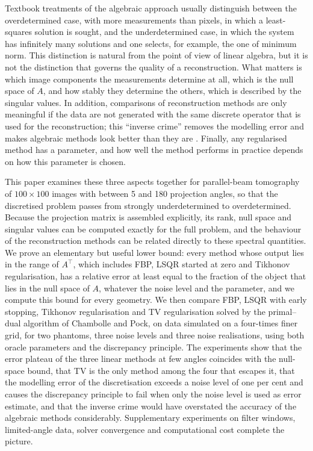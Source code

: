 \documentclass[11pt,a4paper]{article}
\numberwithin{equation}{section}
\theoremstyle{remark}
\newcommand{\T}{\top}
\begin{document}
Textbook treatments of the algebraic approach usually distinguish between the overdetermined case, with more measurements than pixels, in which a least-squares solution is sought, and the underdetermined case, in which the system has infinitely many solutions and one selects, for example, the one of minimum norm. This distinction is natural from the point of view of linear algebra, but it is not the distinction that governs the quality of a reconstruction. What matters is which image components the measurements determine at all, which is the null space of $A$, and how stably they determine the others, which is described by the singular values. In addition, comparisons of reconstruction methods are only meaningful if the data are not generated with the same discrete operator that is used for the reconstruction; this ``inverse crime'' removes the modelling error and makes algebraic methods look better than they are \citep{colton1998,kaipio2005}. Finally, any regularised method has a parameter, and how well the method performs in practice depends on how this parameter is chosen.

This paper examines these three aspects together for parallel-beam tomography of $100\times100$ images with between 5 and 180 projection angles, so that the discretised problem passes from strongly underdetermined to overdetermined. Because the projection matrix is assembled explicitly, its rank, null space and singular values can be computed exactly for the full problem, and the behaviour of the reconstruction methods can be related directly to these spectral quantities. We prove an elementary but useful lower bound: every method whose output lies in the range of $A^\T$, which includes FBP, LSQR started at zero and Tikhonov regularisation, has a relative error at least equal to the fraction of the object that lies in the null space of $A$, whatever the noise level and the parameter, and we compute this bound for every geometry. We then compare FBP, LSQR with early stopping, Tikhonov regularisation and TV regularisation solved by the primal--dual algorithm of Chambolle and Pock, on data simulated on a four-times finer grid, for two phantoms, three noise levels and three noise realisations, using both oracle parameters and the discrepancy principle. The experiments show that the error plateau of the three linear methods at few angles coincides with the null-space bound, that TV is the only method among the four that escapes it, that the modelling error of the discretisation exceeds a noise level of one per cent and causes the discrepancy principle to fail when only the noise level is used as error estimate, and that the inverse crime would have overstated the accuracy of the algebraic methods considerably. Supplementary experiments on filter windows, limited-angle data, solver convergence and computational cost complete the picture.
\end{document}
